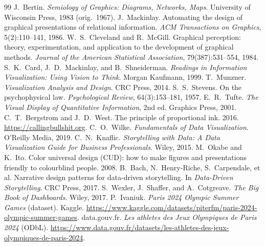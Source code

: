 \documentclass[11pt]{article}
\begin{document}
\begingroup
\small
\begin{thebibliography}{99}
 J.~Bertin. \emph{Semiology of Graphics: Diagrams, Networks, Maps}. University of Wisconsin Press, 1983 (orig.\ 1967).
 J.~Mackinlay. Automating the design of graphical presentations of relational information. \emph{ACM Transactions on Graphics}, 5(2):110--141, 1986.
 W.~S.~Cleveland and R.~McGill. Graphical perception: theory, experimentation, and application to the development of graphical methods. \emph{Journal of the American Statistical Association}, 79(387):531--554, 1984.
 S.~K.~Card, J.~D.~Mackinlay, and B.~Shneiderman. \emph{Readings in Information Visualization: Using Vision to Think}. Morgan Kaufmann, 1999.
 T.~Munzner. \emph{Visualization Analysis and Design}. CRC Press, 2014.
 S.~S.~Stevens. On the psychophysical law. \emph{Psychological Review}, 64(3):153--181, 1957.
 E.~R.~Tufte. \emph{The Visual Display of Quantitative Information}, 2nd ed. Graphics Press, 2001.
 C.~T.~Bergstrom and J.~D.~West. The principle of proportional ink. 2016. \url{https://callingbullshit.org}.
 C.~O.~Wilke. \emph{Fundamentals of Data Visualization}. O'Reilly Media, 2019.
 C.~N.~Knaflic. \emph{Storytelling with Data: A Data Visualization Guide for Business Professionals}. Wiley, 2015.
 M.~Okabe and K.~Ito. Color universal design (CUD): how to make figures and presentations friendly to colourblind people. 2008.
 B.~Bach, N.~Henry-Riche, S.~Carpendale, et al. Narrative design patterns for data-driven storytelling. In \emph{Data-Driven Storytelling}. CRC Press, 2017.
 S.~Wexler, J.~Shaffer, and A.~Cotgreave. \emph{The Big Book of Dashboards}. Wiley, 2017.
 P.~Ivaniuk. \emph{Paris 2024 Olympic Summer Games} (dataset). Kaggle. \url{https://www.kaggle.com/datasets/piterfm/paris-2024-olympic-summer-games}.
 data.gouv.fr. \emph{Les athletes des Jeux Olympiques de Paris 2024} (ODbL). \url{https://www.data.gouv.fr/datasets/les-athletes-des-jeux-olympiques-de-paris-2024}.
\end{thebibliography}
\endgroup
\end{document}
